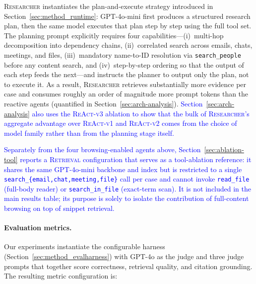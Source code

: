 \textsc{Researcher} instantiates the plan-and-execute strategy introduced in Section~\ref{sec:method_runtime}: GPT-4o-mini first produces a structured research plan, then the same model executes that plan step by step using the full tool set. The planning prompt explicitly requires four capabilities---(i)~multi-hop decomposition into dependency chains, (ii)~correlated search across emails, chats, meetings, and files, (iii)~mandatory name-to-ID resolution via \texttt{search\_people} before any content search, and (iv)~step-by-step ordering so that the output of each step feeds the next---and instructs the planner to output only the plan, not to execute it. As a result, \textsc{Researcher} retrieves substantially more evidence per case and consumes roughly an order of magnitude more prompt tokens than the reactive agents (quantified in Section~\ref{sec:arch-analysis}). \textcolor{blue}{Section~\ref{sec:arch-analysis} also uses the \textsc{ReAct-v3} ablation to show that the bulk of \textsc{Researcher}'s aggregate advantage over \textsc{ReAct-v1} and \textsc{ReAct-v2} comes from the choice of model family rather than from the planning stage itself.}

\textcolor{blue}{Separately from the four browsing-enabled agents above, Section~\ref{sec:ablation-tool} reports a \textsc{Retrieval} configuration that serves as a tool-ablation reference: it shares the same GPT-4o-mini backbone and index but is restricted to a single \texttt{search\_\{email,chat,meeting,file\}} call per case and cannot invoke \texttt{read\_file} (full-body reader) or \texttt{search\_in\_file} (exact-term scan). It is not included in the main results table; its purpose is solely to isolate the contribution of full-content browsing on top of snippet retrieval.}

\paragraph{Evaluation metrics.}
\label{sec:eval-metrics}
Our experiments instantiate the configurable harness (Section~\ref{sec:method_evalharness}) with GPT-4o as the judge and three judge prompts that together score correctness, retrieval quality, and citation grounding. The resulting metric configuration is:

